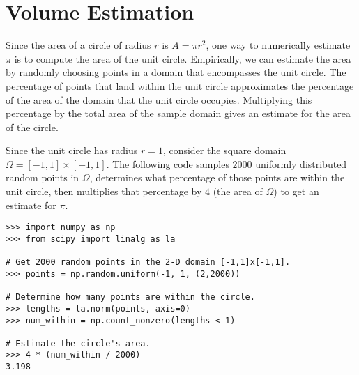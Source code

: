 

\section*{Volume Estimation} %

Since the area of a circle of radius $r$ is $A = \pi r^2$, one way to numerically estimate $\pi$ is to compute the area of the unit circle.
Empirically, we can estimate the area by randomly choosing points in a domain that encompasses the unit circle.
The percentage of points that land within the unit circle approximates the percentage of the area of the domain that the unit circle occupies.
Multiplying this percentage by the total area of the sample domain gives an estimate for the area of the circle.

Since the unit circle has radius $r=1$, consider the square domain $\Omega=[-1,1]\times[-1,1]$.
The following code samples $2000$ uniformly distributed random points in $\Omega$, determines what percentage of those points are within the unit circle, then multiplies that percentage by $4$ (the area of $\Omega$) to get an estimate for $\pi$.

\begin{lstlisting}
>>> import numpy as np
>>> from scipy import linalg as la

# Get 2000 random points in the 2-D domain [-1,1]x[-1,1].
>>> points = np.random.uniform(-1, 1, (2,2000))

# Determine how many points are within the circle.
>>> lengths = la.norm(points, axis=0)
>>> num_within = np.count_nonzero(lengths < 1)

# Estimate the circle's area.
>>> 4 * (num_within / 2000)
3.198
\end{lstlisting}

